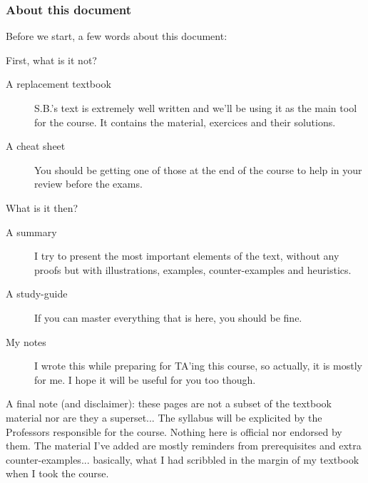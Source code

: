 \subsubsection{About this document}
Before we start, a few words about this document:

First, what is it not?
\begin{description}
    \item [A replacement textbook] S.B.'s text is extremely well written and we'll be using it as the main tool for the course. It contains the material, exercices and their solutions.
    \item [A cheat sheet] You should be getting one of those at the end of the course to help in your review before the exams.
\end{description}
What is it then?
\begin{description}
    \item [A summary] I try to present the most important elements of the text, without any proofs but with illustrations, examples, counter-examples and heuristics.
    \item [A study-guide] If you can master everything that is here, you should be fine.
    \item [My notes] I wrote this while preparing for TA'ing this course, so actually, it is mostly for me. I hope it will be useful for you too though.
\end{description}

A final note (and disclaimer): these pages are not a subset of the textbook material nor are they a superset... The syllabus will be explicited by the Professors responsible for the course. Nothing here is official nor endorsed by them. The material I've added are mostly reminders from prerequisites and extra counter-examples... basically, what I had scribbled in the margin of my textbook when I took the course.
